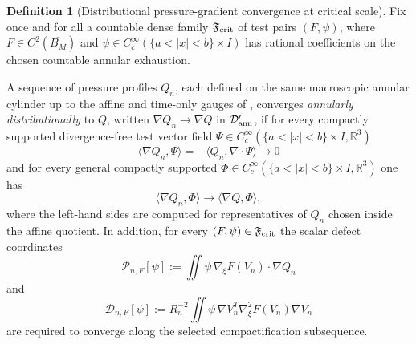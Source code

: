 \documentclass[11pt]{amsart}
\numberwithin{equation}{section}
\theoremstyle{plain}
\theoremstyle{definition}
\newtheorem{definition}[definition]{Definition}
\theoremstyle{remark}
\begin{document}
\begin{definition}[Distributional pressure-gradient convergence at critical scale]
\label{def:critical-pressure-gradient-convergence}
Fix once and for all a countable dense family \(\mathfrak F_{\rm crit}\) of test
pairs \((F,\psi)\), where \(F\in C^2(\overline{B_M})\) and
\(\psi\in C_c^\infty(\{a<|x|<b\}\times I)\) has rational coefficients on the
chosen countable annular exhaustion.

A sequence of pressure profiles \(Q_n\), each defined on the same macroscopic
annular cylinder up to the affine and time-only gauges of
, converges \emph{annularly
distributionally} to \(Q\), written \(\nabla Q_n\to\nabla Q\) in
\(\mathcal D'_{\rm ann}\), if for every compactly supported divergence-free
test vector field \(\Psi\in C_c^\infty(\{a<|x|<b\}\times I,\mathbb R^3)\)
\[
   \langle\nabla Q_n,\Psi\rangle
   =-\langle Q_n,\nabla\cdot\Psi\rangle\to0
\]
and for every general compactly supported \(\Phi\in C_c^\infty(\{a<|x|<b\}\times
I,\mathbb R^3)\) one has
\[
   \langle\nabla Q_n,\Phi\rangle\to\langle\nabla Q,\Phi\rangle ,
\]
where the left-hand sides are computed for representatives of \(Q_n\) chosen
inside the affine quotient.  In addition, for every
\((F,\psi)\in\mathfrak F_{\rm crit}\) the scalar defect coordinates
\[
   \mathscr P_{n,F}[\psi]
   :=
   \iint \psi\,\nabla_\xi F(V_n)\cdot\nabla Q_n
\]
and
\[
   \mathscr D_{n,F}[\psi]
   :=
   R_n^{-2}\iint
   \psi\,\nabla V_n^T\nabla_\xi^2F(V_n)\nabla V_n
\]
are required to converge along the selected compactification subsequence.
\end{definition}
\end{document}
